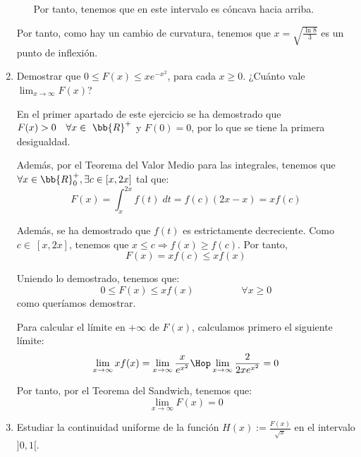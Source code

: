 \documentclass[12pt]{article}
\begin{document}
\begin{ejercicio}
\begin{enumerate}
\begin{itemize}
        Por tanto, tenemos que en este intervalo es cóncava hacia arriba.
    \end{itemize}

    Por tanto, como hay un cambio de curvatura, tenemos que $x=\sqrt{\frac{\ln 8}{3}}$ es un punto de inflexión.

    \item Demostrar que $0\leq F(x)\leq xe^{-x^2}$, para cada $x\geq 0$. ¿Cuánto vale $\displaystyle \lim_{x\to \infty}F(x)$?

    En el primer apartado de este ejercicio se ha demostrado que $F(x)>0\quad \forall x\in~\bb{R}^+$ y $F(0)=0$, por lo que se tiene la primera desigualdad.

    Además, por el Teorema del Valor Medio para las integrales, tenemos que $\forall x\in \bb{R}^+_0, \exists c\in [x,2x]$ tal que:
    \begin{equation*}
        F(x)=\int_x^{2x}f(t)\;dt =f(c)(2x-x)=xf(c)
    \end{equation*}

    Además, se ha demostrado que $f(t)$ es estrictamente decreciente. Como $c\in~[x,2x]$, tenemos que $x\leq c\Longrightarrow f(x)\geq f(c)$. Por tanto,
    \begin{equation*}
        F(x)=xf(c) \leq xf(x)
    \end{equation*}

    Uniendo lo demostrado, tenemos que:
    \begin{equation*}
        0\leq F(x)\leq xf(x) \hspace{2cm} \forall x\geq 0
    \end{equation*}
    como queríamos demostrar.\vspace{1cm}

    Para calcular el límite en $+\infty$ de $F(x)$, calculamos primero el siguiente límite:
    \begin{equation*}
        \lim_{x\to \infty}xf(x)
        = \lim_{x\to \infty}\frac{x}{e^{x^2}}
        \Hop
        \lim_{x\to \infty}\frac{2}{2x e^{x^2}} = 0
    \end{equation*}

    Por tanto, por el Teorema del Sandwich, tenemos que:
    \begin{equation*}
        \lim_{x\to \infty}F(x) = 0
    \end{equation*}

    \item Estudiar la continuidad uniforme de la función $H(x):=\frac{F(x)}{\sqrt{x}}$ en el intervalo $]0,1[$.


\end{enumerate}
\end{ejercicio}
\end{document}
